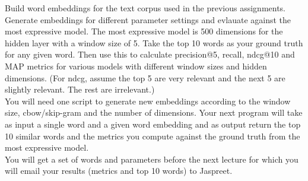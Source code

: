 \newcommand{\REM}[1]{}







\begin{hwproblem}

Build word embeddings for the text corpus used in the previous assignments. Generate embeddings for different parameter settings and evlauate against the most expressive model. The most expressive model is 500 dimensions for the hidden layer with a window size of 5. Take the top 10 words as your ground truth for any given word. Then use this to calculate precision@5, recall, ndcg@10 and MAP metrics for various models with different window sizes and hidden dimensions. (For ndcg, assume the top 5 are very relevant and the next 5 are slightly relevant. The rest are irrelevant.)
\\
You will need one script to generate new embeddings according to the window size, cbow/skip-gram and the number of dimensions. Your next program will take as input a single word and a given word embedding and as output return the top 10 similar words and the metrics you compute against the ground truth from the most expressive model.
 \\
You will get a set of words and parameters before the next lecture for which you will email your results (metrics and top 10 words) to Jaspreet.
 
\hwsolution{

}

\end{hwproblem}






